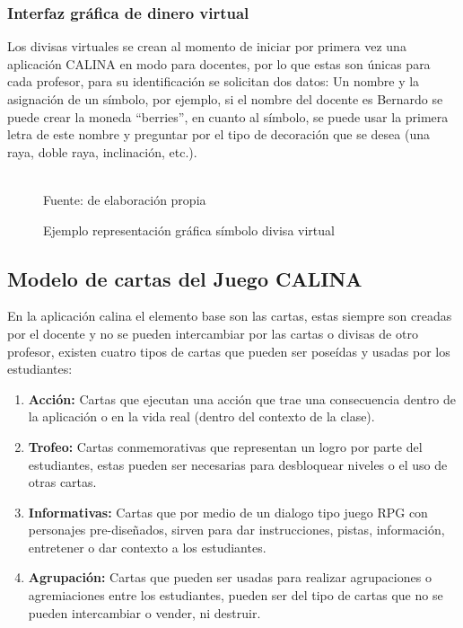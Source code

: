 \subsubsection{Interfaz gráfica de dinero virtual}

Los divisas virtuales se crean al momento de iniciar por primera vez una aplicación CALINA en modo para 
docentes, por lo que estas son únicas para cada profesor, para su identificación se solicitan dos datos: Un 
nombre y la asignación de un símbolo, por ejemplo, si el nombre del docente es Bernardo se puede crear la 
moneda ``berries'', en cuanto al símbolo, se puede usar la primera letra de este nombre y preguntar por el tipo 
de decoración que se desea (una raya, doble raya, inclinación, etc.).

\begin{figure}[!htb]
\caption{Ejemplo representación gráfica símbolo divisa virtual}
\label{img:simbolosdivisas}
\centering
\begin{adjustbox}{width=10cm}
	
\end{adjustbox}
\\
{\footnotesize Fuente: de elaboración propia}
\end{figure}

\subsection{Modelo de cartas del Juego CALINA}

En la aplicación calina el elemento base son las cartas, estas siempre son creadas por el docente y no se 
pueden intercambiar por las cartas o divisas de otro profesor, existen cuatro tipos de cartas que pueden ser 
poseídas y usadas por los estudiantes:

\begin{enumerate}
\item \textbf{Acción:} Cartas que ejecutan una acción que trae una consecuencia dentro de la aplicación o en 
la vida real (dentro del contexto de la clase).
\item \textbf{Trofeo:} Cartas conmemorativas que representan un logro por parte del estudiantes, estas pueden
ser necesarias para desbloquear niveles o el uso de otras cartas.
\item \textbf{Informativas:} Cartas que por medio de un dialogo tipo juego RPG con personajes pre-diseñados, 
sirven para dar instrucciones, pistas, información, entretener o dar contexto a los estudiantes.
\item \textbf{Agrupación:} Cartas que pueden ser usadas para realizar agrupaciones o agremiaciones entre los 
estudiantes, pueden ser del tipo de cartas que no se pueden intercambiar o vender, ni destruir.
\end{enumerate}

